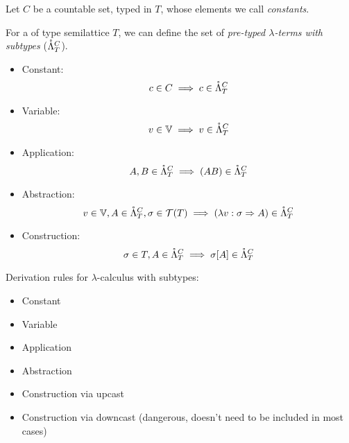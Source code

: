 \documentclass[main.tex]{subfiles}
\begin{document}
\begin{defn}
    Let $C$ be a countable set, typed in $T$,
    whose elements we call \emph{constants}.

    For a of type semilattice $T$, we can define the set of
    \emph{pre-typed $\lambda$-terms with subtypes} ($\mathring{\Lambda}_T^C$).

    \begin{itemize}
        \item Constant:    \[ c \in C \implies c \in \mathring{\Lambda}_T^C \]
        \item Variable:    \[ v \in \mathbb{V} \implies v \in \mathring{\Lambda}_T^C \]
        \item Application: \[ A, B \in \mathring{\Lambda}_T^C \implies (AB) \in \mathring{\Lambda}_T^C \]
        \item Abstraction: \[ v \in \mathbb{V}, A \in \mathring{\Lambda}_T^C, \sigma \in \mathcal{T}( T )
                \implies (\lambda v : \sigma \Rightarrow A) \in \mathring{\Lambda}_T^C \]
        \item Construction: \[ \sigma \in T, A \in \mathring{\Lambda}_T^C
                \implies \sigma[A] \in \mathring{\Lambda}_T^C \]
    \end{itemize}
\end{defn}

\begin{defn}
    Derivation rules for $\lambda$-calculus with subtypes:

    \begin{itemize}
        \item Constant
        \item Variable
        \item Application
        \item Abstraction
        \item Construction via upcast
        \item Construction via downcast (dangerous, doesn't need to be included in most cases)
    \end{itemize}
\end{defn}
\end{document}
